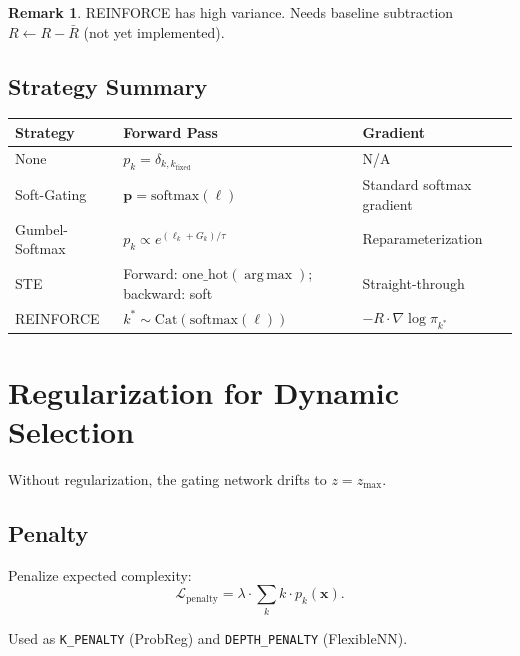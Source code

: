 \documentclass[11pt,a4paper]{article}
\theoremstyle{definition}
\newtheorem{remark}{Remark}[section]
\newcommand{\bx}{\mathbf{x}}
\newcommand{\softmax}{\mathrm{softmax}}
\DeclareMathOperator*{\argmax}{arg\,max}
\begin{document}
\begin{remark}
REINFORCE has high variance. Needs baseline subtraction
$R \leftarrow R - \bar{R}$ (not yet implemented).
\end{remark}

\subsection{Strategy Summary}

\begin{center}
\renewcommand{\arraystretch}{1.4}
\begin{tabular}{lp{4.5cm}p{4.5cm}}
\toprule
\textbf{Strategy} & \textbf{Forward Pass} & \textbf{Gradient} \\
\midrule
None & $p_k = \delta_{k, k_{\mathrm{fixed}}}$ & N/A \\
Soft-Gating & $\mathbf{p} = \softmax(\boldsymbol{\ell})$ & Standard softmax gradient \\
Gumbel-Softmax & $p_k \propto e^{(\ell_k+G_k)/\tau}$ & Reparameterization \\
STE & Forward: $\mathrm{one\_hot}(\argmax)$; backward: soft & Straight-through \\
REINFORCE & $k^* \sim \mathrm{Cat}(\softmax(\boldsymbol{\ell}))$ & $-R \cdot \nabla \log \pi_{k^*}$ \\
\bottomrule
\end{tabular}
\end{center}

\section{Regularization for Dynamic Selection}

Without regularization, the gating network drifts to $z = z_{\max}$.

\subsection{Penalty}

Penalize expected complexity:
\begin{equation}
  \mathcal{L}_{\mathrm{penalty}} = \lambda \cdot \sum_{k} k \cdot p_k(\bx).
  \label{eq:penalty}
\end{equation}

Used as \texttt{K\_PENALTY} (ProbReg) and \texttt{DEPTH\_PENALTY} (FlexibleNN).
\end{document}

